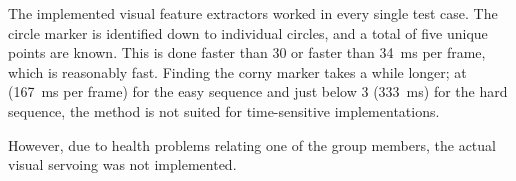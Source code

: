 
The implemented visual feature extractors worked in every single test case.
The circle marker is identified down to individual circles, and a total of five unique points are known.
This is done faster than \SI{30}{\fps} or faster than \SI{34}{\milli\second} per frame, which is reasonably fast.
Finding the corny marker takes a while longer;
at  (\SI{167}{\milli\second} per frame) for the easy sequence and just below \SI{3}{\fps} (\SI{333}{\milli\second}) for the hard sequence,
the method is not suited for time-sensitive implementations.

However, due to health problems relating one of the group members, the actual visual servoing was not implemented.
